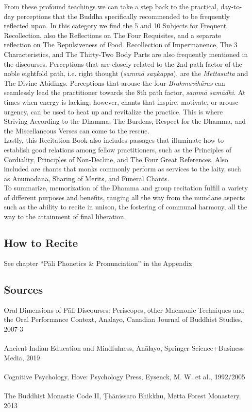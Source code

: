 From these profound teachings we can take a step back to the practical, day-to-day perceptions that the Buddha specifically recommended to be frequently reflected upon. In this category we find the 5 and 10 Subjects for Frequent Recollection, also the Reflections on The Four Requisites, and a separate reflection on The Repulsiveness of Food. Recollection of Impermanence, The 3 Characteristics, and The Thirty-Two Body Parts are also frequently mentioned in the discourses. Perceptions that are closely related to the 2nd path factor of the noble eightfold path, i.e. right thought (\textit{sammā saṇkappa}), are the \textit{Mettasutta} and The Divine Abidings. Perceptions that arouse the four \textit{Brahmavihāras} can seamlessly lead the practitioner towards the 8th path factor, \textit{sammā samādhi}. At times when energy is lacking, however, chants that inspire, motivate, or arouse urgency, can be used to heat up and revitalize the practice. This is where Striving According to the Dhamma, The Burdens, Respect for the Dhamma, and the Miscellaneous Verses can come to the rescue.\\

Lastly, this Recitation Book also includes passages that illuminate how to establish good relations among fellow practitioners, such as the Principles of Cordiality, Principles of Non-Decline, and The Four Great References. Also included are chants that monks commonly perform as services to the laity, such as Anumodanā, Sharing of Merits, and Funeral Chants.\\

To summarize, memorization of the Dhamma and group recitation fulfill a variety of different purposes and benefits, ranging all the way from the mundane aspects such as the ability to recite in unison, the fostering of communal harmony, all the way to the attainment of final liberation.\\

\subsection*{How to Recite}

See chapter ``Pāli Phonetics \& Pronunciation'' in the Appendix\\

\subsection*{Sources}
Oral Dimensions of Pāli Discourses: Periscopes, other Mnemonic Techniques and the Oral Performance Context, Analayo, Canadian Journal of Buddhist Studies, 2007-3\\
\\
Ancient Indian Education and Mindfulness, Anālayo, Springer Science+Business Media, 2019\\
\\
Cognitive Psychology, Hove: Psychology Press, Eysenck, M. W. et al., 1992/2005\\
\\
The Buddhist Monastic Code II, Ṭhānissaro Bhikkhu, Metta Forest Monastery, 2013
